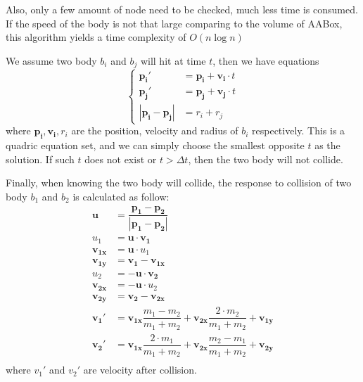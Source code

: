 \documentclass{article}
\begin{document}
\begin{description}
						Also, only a few amount of node need to be checked,
						much less time is consumed. If the speed of the body
						is not that large comparing to the volume of AABox,
						this algorithm yields a time complexity of
						$O(n \log{n})$

						We assume two body $b_i$ and $b_j$ will hit at time
						$t$, then we have equations
						$$
							\left \{
								\begin{aligned}
									\mathbf{p_i \prime} &= \mathbf{p_i}
										+ \mathbf{v_i} \cdot t \\
									\mathbf{p_j \prime} &= \mathbf{p_j}
										+ \mathbf{v_j} \cdot t \\
									|\mathbf{p_i} - \mathbf{p_j}| &= r_i + r_j
								\end{aligned}
							\right .
						$$
						where $\mathbf{p_i},\mathbf{v_i},r_i$ are the position,
						velocity and radius of $b_i$ respectively.
						This is a quadric equation set, and we can simply
						choose the smallest opposite $t$ as the solution. If
						such $t$ does not exist or $t > \Delta t$, then the two
						body will not collide.

						Finally, when knowing the two body will collide, the
						response to collision of two body $b_1$ and $b_2$ is
						calculated as follow\cite{col_rspns}:
						$$
							\begin{aligned}
								\mathbf{u} &= \dfrac{\mathbf{p_1} -
								\mathbf{p_2}}{|\mathbf{p_1} - \mathbf{p_2}|} \\
								u_1 &= \mathbf{u} \cdot \mathbf{v_1} \\
								\mathbf{v_{1x}} &= \mathbf{u} \cdot u_1 \\
								\mathbf{v_{1y}} &= \mathbf{v_1} - \mathbf{v_{1x}} \\
								u_2 &= \mathbf{-u} \cdot \mathbf{v_2} \\
								\mathbf{v_{2x}} &= \mathbf{-u} \cdot u_2 \\
								\mathbf{v_{2y}} &= \mathbf{v_2} - \mathbf{v_{2x}} \\
								\mathbf{v_1 \prime} &=
								\mathbf{v_{1x}} \dfrac{m_1-m_2}{m_1+m_2}
								+ \mathbf{v_{2x}} \dfrac{2\cdot m_2}{m_1+m_2}
								+ \mathbf{v_{1y}} \\
								\mathbf{v_2 \prime} &=
								\mathbf{v_{1x}} \dfrac{2\cdot m_1}{m_1+m_2}
								+ \mathbf{v_{2x}} \dfrac{m_2-m_1}{m_1+m_2}
								+ \mathbf{v_{2y}} \\
							\end{aligned}
						$$
						where $v_1\prime$ and $v_2\prime$ are velocity after
						collision.

				\end{description}
\end{document}
